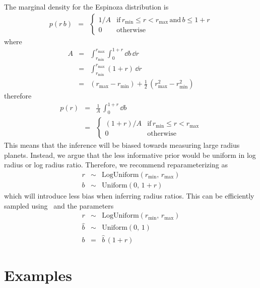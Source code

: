 \documentclass[modern]{aastex62}
\begin{document}
The marginal density for the Espinoza distribution is
\begin{eqnarray}
p(r\,b) &=& \left\{\begin{array}{ll}
1/A & \mathrm{if}\,r_\mathrm{min} \le r < r_\mathrm{max}\,\mathrm{and}\,b\le 1+r\\
0 & \mathrm{otherwise}
\end{array} \right.
\end{eqnarray}
where
\begin{eqnarray}
A &=& \int_{r_\mathrm{min}}^{r_\mathrm{max}} \int_{0}^{1+r}\dd b\,\dd r \\
&=& \int_{r_\mathrm{min}}^{r_\mathrm{max}} (1 + r)\,\dd r\\
&=& (r_\mathrm{max} - r_\mathrm{min}) + \frac{1}{2}\,(r_\mathrm{max}^2 - r_\mathrm{min}^2)
\end{eqnarray}
therefore
\begin{eqnarray}
p(r) &=& \frac{1}{A}\,\int_{0}^{1+r}\dd b \\
&=& \left\{\begin{array}{ll}
  (1+r)/A & \mathrm{if}\,r_\mathrm{min} \le r < r_\mathrm{max} \\
  0 & \mathrm{otherwise}
\end{array}\right.
\end{eqnarray}
This means that the inference will be biased towards measuring large radius planets.
Instead, we argue that the less informative prior would be uniform in log radius or log radius ratio.
Therefore, we recommend reparameterizing as
\begin{eqnarray}
r &\sim& \mathrm{LogUniform}(r_\mathrm{min},\,r_\mathrm{max}) \\
b &\sim& \mathrm{Uniform}(0,\,1+r)
\end{eqnarray}
which will introduce less bias when inferring radius ratios.
This can be efficiently sampled using \exoplanet\ and the parameters
\begin{eqnarray}
  r &\sim& \mathrm{LogUniform}(r_\mathrm{min},\,r_\mathrm{max}) \\
  \hat{b} &\sim& \mathrm{Uniform}(0,\,1) \\
  b &=& \hat{b}\,(1 + r)
\end{eqnarray}

\section{Examples}



\appendix
\end{document}
